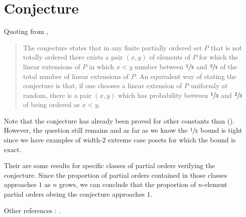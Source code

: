 \section{\onethirdtwothird Conjecture}

Quoting from \cite{wiki:linext},

\begin{quotation}
The \onethirdtwothird conjecture states that in
any finite partially ordered set $P$ that is not totally ordered there exists a
pair $(x,y)$ of elements of $P$ for which the linear extensions of $P$ in which
$x < y$ number between $\sfrac{1}{3}$ and $\sfrac{2}{3}$ of the total number of
linear extensions of $P$. An equivalent way of stating the conjecture is that,
if one chooses a linear extension of $P$ uniformly at random, there is a pair
$(x,y)$ which has probability between $\sfrac{1}{3}$ and $\sfrac{2}{3}$ of
being ordered as $x < y$.
\end{quotation}

Note that the conjecture has already been proved for other constants than
\onethirdtwothird (\cite{kahn1984balancing, linial1984information,
kahn1991balancing, brightwell1995balancing, brightwell1999balanced}).
However, the question still remains and as far as we
know the $\sfrac{1}{3}$ bound is tight since we have examples of width-$2$
extreme case posets for which the bound is exact.


Their are some results for specific classes of partial orders verifying the
conjecture. Since the proportion of partial orders contained in those classes
approaches $1$ as $n$ grows, we can conclude that the proportion of $n$-element
partial orders obeing the \onethirdtwothird conjecture approaches $1$.


Other references : \cite{zaguia20111,peczarski2006gold,peczarski2008gold}.
